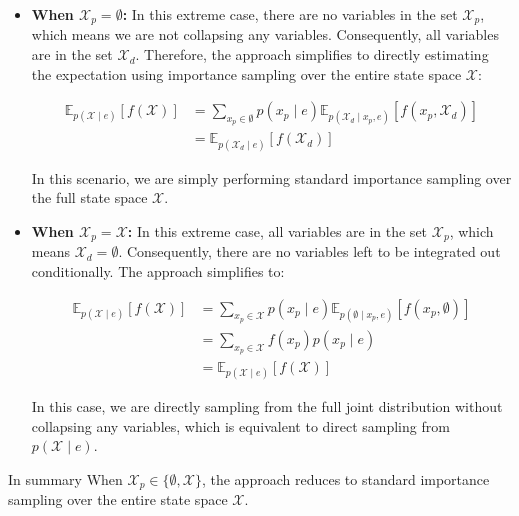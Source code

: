 \documentclass[a4 paper]{article}
\begin{document}
\begin{enumerate}
    \begin{itemize}
        \item \textbf{When \( \mathcal{X}_p = \emptyset \):}
        In this extreme case, there are no variables in the set \( \mathcal{X}_p \), which means we are not collapsing any variables. Consequently, all variables are in the set \( \mathcal{X}_d \). Therefore, the approach simplifies to directly estimating the expectation using importance sampling over the entire state space \( \mathcal{X} \):
    
        \begin{align*}
        \mathbb{E}_{p(\mathcal{X} \mid e)} [f(\mathcal{X})] &= \sum_{x_p \in \emptyset} p(x_p \mid e) \mathbb{E}_{p(\mathcal{X}_d \mid x_p, e)} [f(x_p, \mathcal{X}_d)] \\
        &= \mathbb{E}_{p(\mathcal{X}_d \mid e)} [f(\mathcal{X}_d)]
        \end{align*}
    
        In this scenario, we are simply performing standard importance sampling over the full state space \( \mathcal{X} \).
    
        \item \textbf{When \( \mathcal{X}_p = \mathcal{X} \):}
        In this extreme case, all variables are in the set \( \mathcal{X}_p \), which means \( \mathcal{X}_d = \emptyset \). Consequently, there are no variables left to be integrated out conditionally. The approach simplifies to:
    
        \begin{align*}
        \mathbb{E}_{p(\mathcal{X} \mid e)} [f(\mathcal{X})] &= \sum_{x_p \in \mathcal{X}} p(x_p \mid e) \mathbb{E}_{p(\emptyset \mid x_p, e)} [f(x_p, \emptyset)] \\
        &= \sum_{x_p \in \mathcal{X}} f(x_p) p(x_p \mid e) \\
        &= \mathbb{E}_{p(\mathcal{X} \mid e)} [f(\mathcal{X})]
        \end{align*}
    
        In this case, we are directly sampling from the full joint distribution without collapsing any variables, which is equivalent to direct sampling from \( p(\mathcal{X} \mid e) \).
    \end{itemize}
    
    In summary When \( \mathcal{X}_p \in \{\emptyset, \mathcal{X} \} \), the approach reduces to standard importance sampling over the entire state space \( \mathcal{X} \).

    



\end{enumerate}
\end{document}
